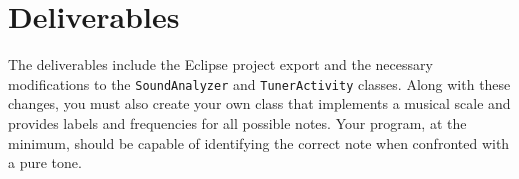 \section{Deliverables}

The deliverables include the Eclipse project export and the necessary modifications to the {\tt SoundAnalyzer} and \verb=TunerActivity= classes. 
Along with these changes, you must also create your own class that implements a musical scale and provides labels and frequencies for all possible notes.
Your program, at the minimum, should be capable of identifying the correct note when confronted with a pure tone.
